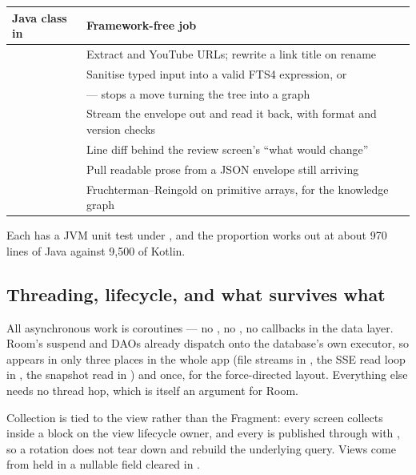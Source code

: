 \noindent
\begin{tabularx}{\linewidth}{L{4.7cm} X}
\toprule
\textbf{Java class in } & \textbf{Framework-free job} \\
\midrule
{} & Extract  and YouTube URLs; rewrite a link title on
rename \\
 & Sanitise typed input into a valid FTS4  expression, or  \\
 &  --- stops a move turning the tree into a graph \\
 \newline {} & Stream the  envelope
out and read it back, with format and version checks \\
 & Line diff behind the review screen's ``what would change'' \\
 & Pull readable prose from a JSON envelope still arriving \\
 & Fruchterman--Reingold on primitive arrays, for the knowledge graph \\
\bottomrule
\end{tabularx}

\medskip

Each has a JVM unit test under , and the proportion works out at about 970 lines
of Java against 9{,}500 of Kotlin.

\subsection{Threading, lifecycle, and what survives what}

All asynchronous work is coroutines --- no , no , no callbacks in the
data layer. Room's suspend and  DAOs already dispatch onto the database's own executor, so
 appears in only three places in the whole app (file streams in
, the SSE read loop in , the snapshot read in
) and  once, for the force-directed layout. Everything
else needs no thread hop, which is itself an argument for Room.

Collection is tied to the view rather than the Fragment: every screen collects inside a
 block on the view lifecycle owner, and every  is
published through  with , so a rotation
does not tear down and rebuild the underlying query. Views come from  held in a
nullable field cleared in .

